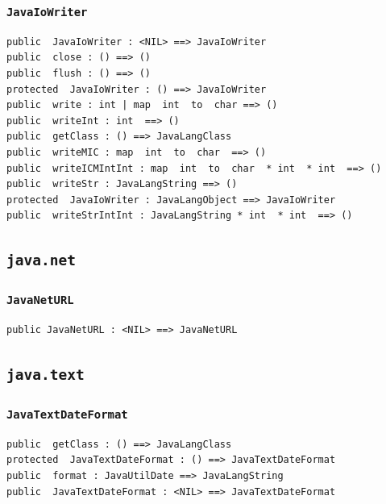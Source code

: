 \documentclass[\pformat,12pt]{article}
\begin{document}
\subsubsection{\texttt{JavaIoWriter}}
\begin{small}
\begin{verbatim}
public  JavaIoWriter : <NIL> ==> JavaIoWriter
public  close : () ==> ()
public  flush : () ==> ()
protected  JavaIoWriter : () ==> JavaIoWriter
public  write : int | map  int  to  char ==> ()
public  writeInt : int  ==> ()
public  getClass : () ==> JavaLangClass
public  writeMIC : map  int  to  char  ==> ()
public  writeICMIntInt : map  int  to  char  * int  * int  ==> ()
public  writeStr : JavaLangString ==> ()
protected  JavaIoWriter : JavaLangObject ==> JavaIoWriter
public  writeStrIntInt : JavaLangString * int  * int  ==> ()
\end{verbatim}
\end{small}

\subsection{\texttt{java.net}}

\subsubsection{\texttt{JavaNetURL}}
\begin{small}
\begin{verbatim}
public JavaNetURL : <NIL> ==> JavaNetURL
\end{verbatim}
\end{small}

\subsection{\texttt{java.text}}

\subsubsection{\texttt{JavaTextDateFormat}}
\begin{small}
\begin{verbatim}
public  getClass : () ==> JavaLangClass
protected  JavaTextDateFormat : () ==> JavaTextDateFormat
public  format : JavaUtilDate ==> JavaLangString
public  JavaTextDateFormat : <NIL> ==> JavaTextDateFormat
\end{verbatim}
\end{small}
\end{document}
